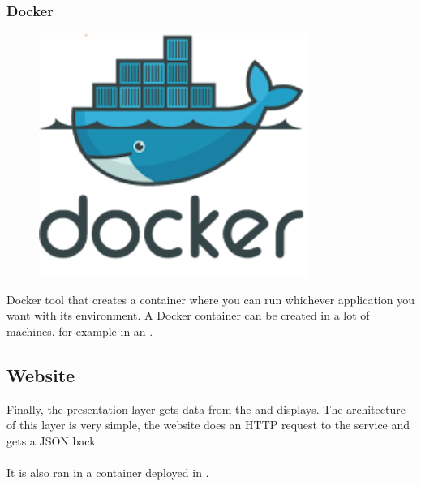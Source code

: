 \subsubsection{Docker} \label{docker}

\begin{figure}[H]
\includegraphics[scale=0.1]{resources/docker-logo.png}
\end{figure}

Docker\cite{docker} tool that creates a container where you can run whichever application you want with its environment. A Docker container can be created in a lot of machines, for example in an .

\subsection{Website}

Finally, the presentation layer gets data from the  and displays. The architecture of this layer is very simple, the website does an HTTP request to the service and gets a JSON back.
\\\\
It is also ran in a  container deployed in .



